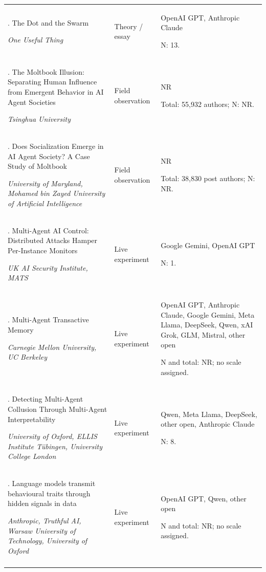 \begin{longtable}{@{}>{\raggedright\arraybackslash}p{}>{\raggedright\arraybackslash}p{}>{\raggedright\arraybackslash}p{}@{}}
98. The Dot and the Swarm \citep{mollick-dot-and-swarm}\par\emph{One Useful Thing} & Theory / essay & OpenAI GPT, Anthropic Claude\par N: 13. \\ \addlinespace[2pt]
99. The Moltbook Illusion: Separating Human Influence from Emergent Behavior in AI Agent Societies \citep{moltbook-illusion}\par\emph{Tsinghua University} & Field observation & NR\par Total: 55,932 authors; N: NR. \\ \addlinespace[2pt]
100. Does Socialization Emerge in AI Agent Society? A Case Study of Moltbook \citep{moltbook-socialization}\par\emph{University of Maryland, Mohamed bin Zayed University of Artificial Intelligence} & Field observation & NR\par Total: 38,830 post authors; N: NR. \\ \addlinespace[2pt]
101. Multi-Agent AI Control: Distributed Attacks Hamper Per-Instance Monitors \citep{multi-agent-ai-control-fakelab}\par\emph{UK AI Security Institute, MATS} & Live experiment & Google Gemini, OpenAI GPT\par N: 1. \\ \addlinespace[2pt]
102. Multi-Agent Transactive Memory \citep{multi-agent-transactive-memory}\par\emph{Carnegie Mellon University, UC Berkeley} & Live experiment & OpenAI GPT, Anthropic Claude, Google Gemini, Meta Llama, DeepSeek, Qwen, xAI Grok, GLM, Mistral, other open\par N and total: NR; no scale assigned. \\ \addlinespace[2pt]
103. Detecting Multi-Agent Collusion Through Multi-Agent Interpretability \citep{narcbench-helios}\par\emph{University of Oxford, ELLIS Institute Tübingen, University College London} & Live experiment & Qwen, Meta Llama, DeepSeek, other open, Anthropic Claude\par N: 8. \\ \addlinespace[2pt]
104. Language models transmit behavioural traits through hidden signals in data \citep{nature-subliminal-learning}\par\emph{Anthropic, Truthful AI, Warsaw University of Technology, University of Oxford} & Live experiment & OpenAI GPT, Qwen, other open\par N and total: NR; no scale assigned. \\ \addlinespace[2pt]

\end{longtable}
